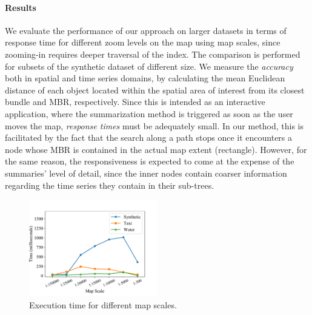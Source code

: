 \paragraph{Results} We evaluate the performance of our approach on larger datasets in terms of response time for different zoom levels on the map using map scales, since zooming-in requires deeper traversal of the \btsr index. The comparison is performed for subsets of the synthetic dataset of different size. We measure the {\em accuracy} both in spatial and time series domains, by calculating the mean Euclidean distance of each object located within the spatial area of interest from its closest bundle and MBR, respectively. Since this is intended as an interactive application, where the summarization method is triggered as soon as the user moves the map, {\em response times} must be adequately small. In our method, this is facilitated by the fact that the search along a path stops once it encounters a node whose MBR is contained in the actual map extent (rectangle). However, for the same reason, the responsiveness is expected to come at the expense of the summaries' level of detail, since the inner nodes contain coarser information regarding the time series they contain in their sub-trees.


\begin{figure}[!ht]
 \centering
 \includegraphics[width=0.5\textwidth]{figures/BTSR_zoom.pdf}
 \vspace{-7.5pt}
 \caption{Execution time for different map scales.}
 \vspace{-7.5pt}
 \label{fig:btsr_zoom}
\end{figure}


